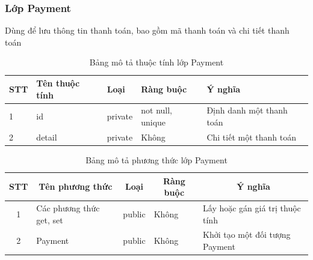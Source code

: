\documentclass[a4paper, 12pt]{article}
\begin{document}
\subsubsection{Lớp Payment}
Dùng để lưu thông tin thanh toán, bao gồm mã thanh toán và chi tiết thanh toán
\begin{table}[H]
	\begin{center}
		\begin{tabular}{|l|l|l|l|l|}
		\hline
		STT & Tên thuộc tính & Loại    & Ràng buộc & Ý nghĩa                  \\ \hline
		1   & id             & private &   not null, unique        & Định danh một thanh toán \\ \hline
		2   & detail         & private &   Không        & Chi tiết một thanh toán  \\ \hline
		\end{tabular}
		\caption{Bảng mô tả thuộc tính lớp Payment}
	\end{center}
\end{table}

\begin{table}[H]
	\begin{center}
		\begin{tabular}{|c|l|c|l|l|}
			\hline
			STT & \multicolumn{1}{c|}{Tên phương thức} & Loại                        & \multicolumn{1}{c|}{Ràng buộc} & \multicolumn{1}{c|}{Ý nghĩa}    \\ \hline
			1   & Các phương thức get, set             & public                      &      Không                          & Lấy hoặc gán giá trị thuộc tính \\ \hline
			2   & Payment                              & \multicolumn{1}{l|}{public} &      Không                          & Khởi tạo một đối tượng Payment  \\ \hline
			\end{tabular}
		\caption{Bảng mô tả phương thức lớp Payment}
	\end{center}
\end{table}
\end{document}
